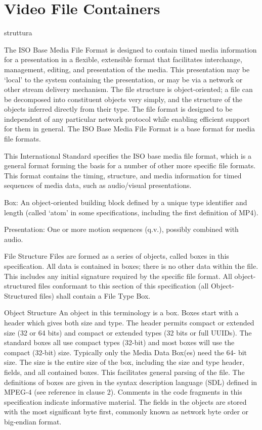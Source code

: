\chapter{Video File Containers}


struttura

The ISO Base Media File Format is designed to contain timed media information for a presentation in a
flexible, extensible format that facilitates interchange, management, editing, and presentation of the media.
This presentation may be ‘local’ to the system containing the presentation, or may be via a network or other
stream delivery mechanism.
The file structure is object-oriented; a file can be decomposed into constituent objects very simply, and the
structure of the objects inferred directly from their type.
The file format is designed to be independent of any particular network protocol while enabling efficient
support for them in general.
The ISO Base Media File Format is a base format for media file formats.

This International Standard specifies the ISO base media file format, which is a general format forming the
basis for a number of other more specific file formats. This format contains the timing, structure, and media
information for timed sequences of media data, such as audio/visual presentations.

Box:
An object-oriented building block defined by a unique type identifier and length (called ‘atom’ in some
specifications, including the first definition of MP4).

Presentation:
One or more motion sequences (q.v.), possibly combined with audio.

File Structure
Files are formed as a series of objects, called boxes in this specification. All data is contained in boxes; there
is no other data within the file. This includes any initial signature required by the specific file format.
All object-structured files conformant to this section of this specification (all Object-Structured files) shall
contain a File Type Box.


Object Structure
An object in this terminology is a box.
Boxes start with a header which gives both size and type. The header permits compact or extended size (32
or 64 bits) and compact or extended types (32 bits or full UUIDs). The standard boxes all use compact types
(32-bit) and most boxes will use the compact (32-bit) size. Typically only the Media Data Box(es) need the 64-
bit size.
The size is the entire size of the box, including the size and type header, fields, and all contained boxes. This
facilitates general parsing of the file.
The definitions of boxes are given in the syntax description language (SDL) defined in MPEG-4 (see reference
in clause 2). Comments in the code fragments in this specification indicate informative material.
The fields in the objects are stored with the most significant byte first, commonly known as network byte order
or big-endian format.

